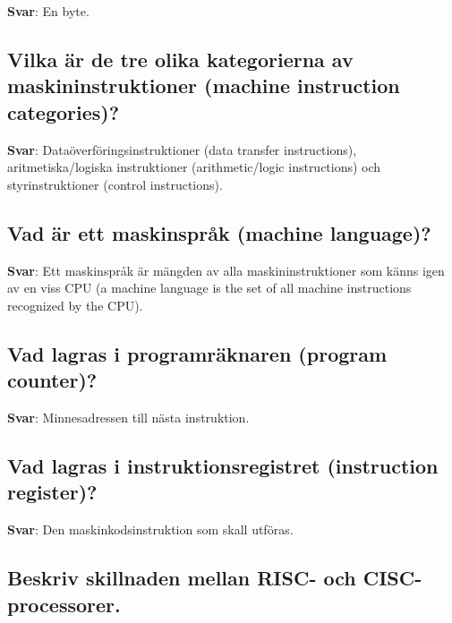 \documentclass[a4paper,11pt,oneside]{article}
\begin{document}
\begin{sloppypar}
\label{q:92:sa:sv:True}

\textbf{Svar}: En byte.



\subsection{Vilka \"ar de tre olika kategorierna av maskininstruktioner (machine instruction categories)?}

\label{q:93:sa:sv:True}

\textbf{Svar}: Data\"overf\"oringsinstruktioner (data transfer instructions), aritmetiska/logiska instruktioner (arithmetic/logic instructions) och styrinstruktioner (control instructions).



\subsection{Vad \"ar ett maskinspr\r{a}k (machine language)?}

\label{q:94:sa:sv:True}

\textbf{Svar}: Ett maskinspr\r{a}k \"ar m\"angden av alla maskininstruktioner som k\"anns igen av en viss CPU (a machine language is the set of all machine instructions recognized by the CPU).



\subsection{Vad lagras i programr\"aknaren (program counter)?}

\label{q:95:sa:sv:True}

\textbf{Svar}: Minnesadressen till n\"asta instruktion.



\subsection{Vad lagras i instruktionsregistret (instruction register)?}

\label{q:96:sa:sv:True}

\textbf{Svar}: Den maskinkodsinstruktion som skall utf\"oras.



\subsection{Beskriv skillnaden mellan RISC- och CISC-processorer.}


\end{sloppypar}
\end{document}
